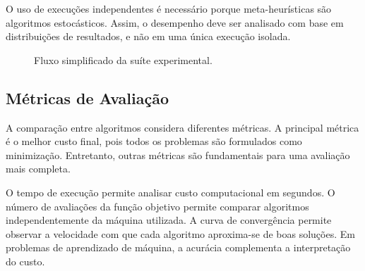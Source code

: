 O uso de execuções independentes é necessário porque meta-heurísticas são algoritmos estocásticos. Assim, o desempenho deve ser analisado com base em distribuições de resultados, e não em uma única execução isolada.

\begin{figure}[htbp]
\centering
{}
\caption{Fluxo simplificado da suíte experimental.}
\label{fig:fluxo-suite}
\end{figure}

\subsection{Métricas de Avaliação}

A comparação entre algoritmos considera diferentes métricas. A principal métrica é o melhor custo final, pois todos os problemas são formulados como minimização. Entretanto, outras métricas são fundamentais para uma avaliação mais completa.

O tempo de execução permite analisar custo computacional em segundos. O número de avaliações da função objetivo permite comparar algoritmos independentemente da máquina utilizada. A curva de convergência permite observar a velocidade com que cada algoritmo aproxima-se de boas soluções. Em problemas de aprendizado de máquina, a acurácia complementa a interpretação do custo.

